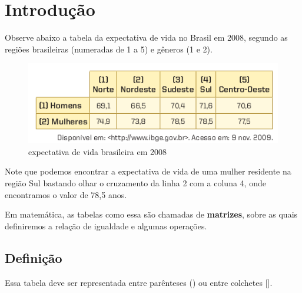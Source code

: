 \chapter{Introdução}

Observe abaixo a tabela da expectativa de vida no Brasil em 2008, segundo as regiões brasileiras (numeradas de 1 a 5) e gêneros (1 e 2). 

\begin{figure}[htb!]
  \centering
  \includegraphics[width=.6\linewidth]{images/quadro.png}
  \caption{expectativa de vida brasileira em 2008}
  \label{fig:}
\end{figure}

Note que podemos encontrar a expectativa de vida de uma mulher residente na região Sul bastando olhar o cruzamento da linha 2 com a coluna 4, onde encontramos o valor de 78,5 anos. 

Em matemática, as tabelas como essa são chamadas de \textbf{matrizes}, sobre as quais definiremos a relação de igualdade e algumas operações. 


\section{Definição}

\begin{note}
  Essa tabela deve ser representada entre parênteses () ou entre colchetes [].
\end{note}


